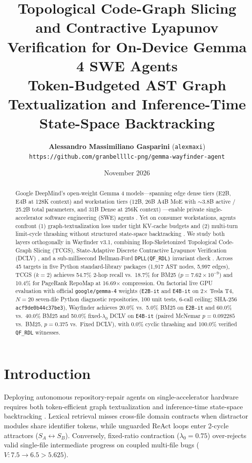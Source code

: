 \documentclass[10pt,twocolumn]{article}
\title{\textbf{Topological Code-Graph Slicing and Contractive Lyapunov Verification for On-Device Gemma 4 SWE Agents}\\[0.35em]
\large Token-Budgeted AST Graph Textualization and Inference-Time State-Space Backtracking}
\author{\textbf{Alessandro Massimiliano Gasparini} (\texttt{alexmaxi})\\
\texttt{https://github.com/granbellllc-png/gemma-wayfinder-agent}}
\date{November 2026}
\begin{document}
\maketitle

\begin{abstract}
Google DeepMind's open-weight Gemma 4 models---spanning edge dense tiers (E2B, E4B at 128K context) and workstation tiers (12B, 26B A4B MoE with $\sim$3.8B active / 25.2B total parameters, and 31B Dense at 256K context) \cite{gemma4}---enable private single-accelerator software engineering (SWE) agents \cite{jimenez2024}. Yet on consumer workstations, agents confront (1) graph-textualization loss under tight KV-cache budgets \cite{repocoder,kgllmbench} and (2) multi-turn limit-cycle thrashing without structured state-space backtracking \cite{yao2023,tot2024}. We study both layers orthogonally in Wayfinder v3.1, combining Hop-Skeletonized Topological Code-Graph Slicing (TCGS), State-Adaptive Discrete Contractive Lyapunov Verification (DCLV) \cite{banach,khalil}, and a sub-millisecond Bellman-Ford \texttt{DPLL(QF\_RDL)} invariant check \cite{nieuwenhuis2006}. Across 45 targets in five Python standard-library packages (1,917 AST nodes, 5,997 edges), TCGS ($k=2$) achieves 54.7\% 2-hop recall vs.\ 18.7\% for BM25 ($p = 7.62 \times 10^{-9}$) and 10.4\% for PageRank RepoMap at 16.69$\times$ compression. On factorial live GPU evaluation with official \texttt{google/gemma-4} weights (\texttt{E2B-it} and \texttt{E4B-it} on 2$\times$ Tesla T4, $N=20$ seven-file Python diagnostic repositories, 100 unit tests, 6-call ceiling; SHA-256 \texttt{acf9de0b44c37be3}), Wayfinder achieves 20.0\% vs.\ 5.0\% BM25 on \texttt{E2B-it} and 60.0\% vs.\ 40.0\% BM25 and 50.0\% fixed-$\lambda_0$ DCLV on \texttt{E4B-it} (paired McNemar $p = 0.092285$ vs.\ BM25, $p = 0.375$ vs.\ Fixed DCLV), with 0.0\% cyclic thrashing and 100.0\% verified \texttt{QF\_RDL} witnesses.
\end{abstract}

\section{Introduction}
Deploying autonomous repository-repair agents \cite{jimenez2024} on single-accelerator hardware \cite{gemma4} requires both token-efficient graph textualization \cite{kgllmbench} and inference-time state-space backtracking \cite{tot2024}. Lexical retrieval \cite{repocoder} misses cross-file domain contracts when distractor modules share identifier tokens, while unguarded ReAct loops \cite{yao2023} enter 2-cycle attractors ($S_A \leftrightarrow S_B$). Conversely, fixed-ratio contraction ($\lambda_0=0.75$) over-rejects valid single-file intermediate progress on coupled multi-file bugs ($V: 7.5 \to 6.5 > 5.625$).
\end{document}
